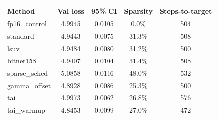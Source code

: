 \begin{tabular}{lcccc}
\hline
Method & Val loss & 95\% CI & Sparsity & Steps-to-target \\
\hline
fp16\_control & 4.9945 & 0.0105 & 0.0\% & 504 \\
standard & 4.9443 & 0.0075 & 31.3\% & 508 \\
lsuv & 4.9484 & 0.0080 & 31.2\% & 500 \\
bitnet158 & 4.9407 & 0.0104 & 31.4\% & 508 \\
sparse\_sched & 5.0858 & 0.0116 & 48.0\% & 532 \\
gamma\_offset & 4.8928 & 0.0086 & 25.3\% & 500 \\
tai & 4.9973 & 0.0062 & 26.8\% & 576 \\
tai\_warmup & 4.8453 & 0.0099 & 27.0\% & 472 \\
\hline
\end{tabular}
